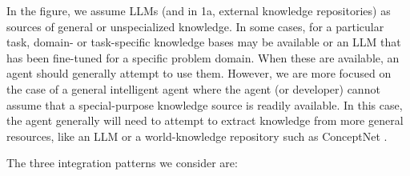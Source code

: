 \documentclass[letterpaper]{article} %
\begin{document}
In the figure, we assume LLMs (and in 1a, external knowledge repositories) as sources of general or unspecialized knowledge. In some cases, for a particular task, domain- or task-specific knowledge bases may be available or an LLM that has been fine-tuned for a specific problem domain. When these are available, an agent should generally attempt to use them. However, we are more focused on the case of a general intelligent agent where the agent (or developer) cannot assume that a special-purpose knowledge source is readily available. In this case, the agent generally will need to attempt to extract knowledge from more general resources, like an LLM or a world-knowledge repository such as ConceptNet \cite{speer_conceptnet_2017}.

The three integration patterns we consider are:
\end{document}
